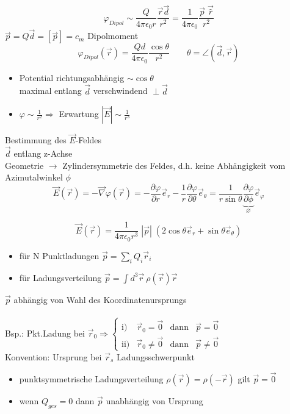\documentclass[titlepage,12pt,a4paper,ngerman]{report}
\begin{document}
 $$\varphi_{Dipol} \sim \frac{Q}{4\pi\epsilon_0 r} \frac{\vec{r}\vec{d}}{r^2} = \frac{1}{4\pi\epsilon_0} \frac{\vec{p}\;\vec{\hat{r}}}{r^2} $$
$ \vec{p} = Q \vec{d} = [\vec{p}] = c_m$ Dipolmoment
 $$\varphi_{Dipol} (\vec{r}) = \frac{Qd}{4\pi\epsilon_0} \frac{\cos \theta}{r^2} \qquad \theta = \angle (\vec{d}, \vec{r})$$
 
\begin{itemize}
\item Potential richtungsabhängig $\sim \cos \theta$\\
maximal entlang $\vec{d}$ verschwindend $\perp \vec{d}$
\item $\varphi \sim \frac{1}{r^2} \Rightarrow$ Erwartung $|\vec{E}| \sim \frac{1}{r^3}$
\end{itemize}

Bestimmung des $\vec{E}$-Feldes\\
$\vec{d}$ entlang z-Achse\\
Geometrie $\rightarrow$ Zylindersymmetrie des Feldes, d.h. keine Abhängigkeit vom Azimutalwinkel $\phi$ 
$$\vec{E}(\vec{r}) = - \vec{\nabla} \varphi(\vec{r}) = -\frac{\partial \varphi}{\partial r} \vec{e}_r - \frac{1}{r} \frac{\partial \varphi}{\partial \theta} \vec{e}_\theta = \frac{1}{r \sin \theta} \underbrace{\frac{\partial \varphi}{\partial \phi}}_{\varnothing} \vec{e}_\varphi$$

$$ \vec{E} (\vec{r}) = \frac{1}{4\pi\epsilon_0 r^3} \; |\vec{p}| \; (2 \cos \theta \vec{e}_r + \sin \theta \vec{e}_\theta ) $$

\begin{itemize}
\item für N Punktladungen $\vec{p} = \sum_i Q_i \vec{r}_i$
\item für Ladungsverteilung $\vec{p} = \int d^3 \vec{r} \ \rho (\vec{r}) \vec{r} $
\end{itemize}

$\vec{p}$ abhängig von Wahl des Koordinatenursprungs\\\\
Bsp.: Pkt.Ladung bei $\vec{r}_0 \Rightarrow \left\{ \begin{array}{cccc}
\textrm{i)} & \vec{r}_0 = \vec{0} & \textrm{dann} & \vec{p} = \vec{0} \\
\textrm{ii)} & \vec{r}_0 \neq \vec{0} & \textrm{dann} & \vec{p} \neq \vec{0}
\end{array} \right. $ \\

Konvention: Ursprung bei $\vec{r}_s$ Ladungsschwerpunkt
\begin{itemize}
\item punktsymmetrische Ladungsverteilung $ \rho(\vec{r}) = \rho(-\vec{r})$ gilt $\vec{p} = \vec{0}$
\item wenn $Q_{ges} = 0$ dann $\vec{p}$ unabhängig von Ursprung
\end{itemize}
\end{document}
